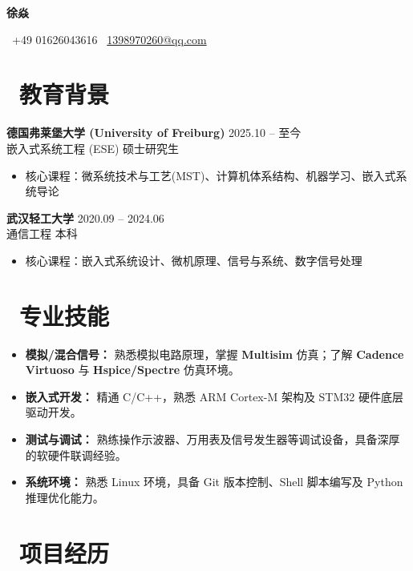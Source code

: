 \documentclass[11pt]{article}
\begin{document}

\centerline{\LARGE\bfseries{徐焱}} 

\centerline{\normalsize{\faPhone\ +49 01626043616 \quad \faEnvelopeO\ \href{mailto:1398970260@qq.com}{1398970260@qq.com}}} 

\section{\makebox[\widthof{\faGraduationCap}][c]{\color{CVBlue}\faGraduationCap}\ 教育背景}    
\textbf{德国弗莱堡大学 (University of Freiburg)} \hfill 2025.10 -- 至今\\[0.3em]
嵌入式系统工程 (ESE) \quad 硕士研究生
\begin{itemize}
    \item 核心课程：微系统技术与工艺(MST)、计算机体系结构、机器学习、嵌入式系统导论
\end{itemize}
\textbf{武汉轻工大学} \hfill 2020.09 -- 2024.06\\[0.3em]
通信工程 \quad 本科
\begin{itemize}
    \item 核心课程：嵌入式系统设计、微机原理、信号与系统、数字信号处理
\end{itemize}

\section{\makebox[\widthof{\faCogs}][c]{\color{CVBlue}\faCogs}\ 专业技能}
\begin{itemize}
    \item \textbf{模拟/混合信号：} 熟悉模拟电路原理，掌握 \textbf{Multisim} 仿真；了解 \textbf{Cadence Virtuoso} 与 \textbf{Hspice/Spectre} 仿真环境。
    \item \textbf{嵌入式开发：} 精通 C/C++，熟悉 ARM Cortex-M 架构及 STM32 硬件底层驱动开发。
    \item \textbf{测试与调试：} 熟练操作示波器、万用表及信号发生器等调试设备，具备深厚的软硬件联调经验。
    \item \textbf{系统环境：} 熟悉 Linux 环境，具备 Git 版本控制、Shell 脚本编写及 Python 推理优化能力。
\end{itemize}

\section{\makebox[\widthof{\faUsers}][c]{\color{CVBlue}\faUsers}\ 项目经历}
\end{document}
